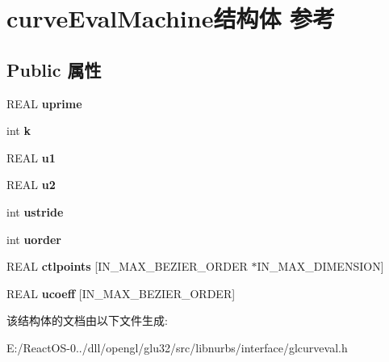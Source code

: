 \hypertarget{structcurve_eval_machine}{}\section{curve\+Eval\+Machine结构体 参考}
\label{structcurve_eval_machine}
\subsection*{Public 属性}
\begin{DoxyCompactItemize}
\item 
\mbox{\label{structcurve_eval_machine_a43883d8ec27f8c928297ea78f90d1f4f}} 
R\+E\+AL {\bfseries uprime}
\item 
\mbox{\label{structcurve_eval_machine_a13703b1a6418c308c468c5b5b35f7200}} 
int {\bfseries k}
\item 
\mbox{\label{structcurve_eval_machine_ab83a4b05fc2adec71688e99a7b22a5e9}} 
R\+E\+AL {\bfseries u1}
\item 
\mbox{\label{structcurve_eval_machine_ab1278b6da5c14641866cf18972d27626}} 
R\+E\+AL {\bfseries u2}
\item 
\mbox{\label{structcurve_eval_machine_aa1e38ef418ef79f85cd6b42c95919bd5}} 
int {\bfseries ustride}
\item 
\mbox{\label{structcurve_eval_machine_a443e1311a3bebc849e99f822b6591c93}} 
int {\bfseries uorder}
\item 
\mbox{\label{structcurve_eval_machine_af658cf40e30ab3eb1b6a746aa182fd47}} 
R\+E\+AL {\bfseries ctlpoints} \mbox{[}I\+N\+\_\+\+M\+A\+X\+\_\+\+B\+E\+Z\+I\+E\+R\+\_\+\+O\+R\+D\+ER $\ast$I\+N\+\_\+\+M\+A\+X\+\_\+\+D\+I\+M\+E\+N\+S\+I\+ON\mbox{]}
\item 
\mbox{\label{structcurve_eval_machine_ab5817120b04bf28efb08962d9a9cb4aa}} 
R\+E\+AL {\bfseries ucoeff} \mbox{[}I\+N\+\_\+\+M\+A\+X\+\_\+\+B\+E\+Z\+I\+E\+R\+\_\+\+O\+R\+D\+ER\mbox{]}
\end{DoxyCompactItemize}


该结构体的文档由以下文件生成\+:\begin{DoxyCompactItemize}
\item 
E\+:/\+React\+O\+S-\/0../dll/opengl/glu32/src/libnurbs/interface/glcurveval.\+h\end{DoxyCompactItemize}
